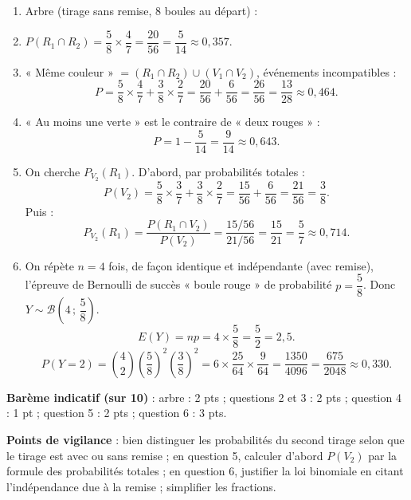\documentclass[11pt]{article}
\newcommand{\legende}[1]{\par\vspace{6pt}{\popsemi\fontsize{9}{11.5}\selectfont\color{popmuted}#1}}
\begin{document}
\begin{corrige}
\begin{enumerate}
\item Arbre (tirage sans remise, 8 boules au départ) :
\begin{popfigure}
\legende{Tirage successif sans remise de 2 boules}
\end{popfigure}
\item $P(R_1\cap R_2)=\dfrac58\times\dfrac47=\dfrac{20}{56}=\dfrac{5}{14}\approx0,357$.
\item « Même couleur » $=(R_1\cap R_2)\cup(V_1\cap V_2)$, événements incompatibles :
\[P=\dfrac58\times\dfrac47+\dfrac38\times\dfrac27=\dfrac{20}{56}+\dfrac{6}{56}=\dfrac{26}{56}=\dfrac{13}{28}\approx0,464.\]
\item « Au moins une verte » est le contraire de « deux rouges » :
\[P=1-\dfrac{5}{14}=\dfrac{9}{14}\approx0,643.\]
\item On cherche $P_{V_2}(R_1)$. D'abord, par probabilités totales :
\[P(V_2)=\dfrac58\times\dfrac37+\dfrac38\times\dfrac27=\dfrac{15}{56}+\dfrac{6}{56}=\dfrac{21}{56}=\dfrac38.\]
Puis :
\[P_{V_2}(R_1)=\dfrac{P(R_1\cap V_2)}{P(V_2)}=\dfrac{15/56}{21/56}=\dfrac{15}{21}=\dfrac57\approx0,714.\]
\item On répète $n=4$ fois, de façon identique et indépendante (avec remise), l'épreuve de Bernoulli de succès « boule rouge » de probabilité $p=\dfrac58$. Donc $Y\sim\mathcal{B}\left(4\,;\,\dfrac58\right)$.
\[E(Y)=np=4\times\dfrac58=\dfrac52=2,5.\]
\[P(Y=2)=\binom{4}{2}\left(\dfrac58\right)^2\left(\dfrac38\right)^2=6\times\dfrac{25}{64}\times\dfrac{9}{64}=\dfrac{1350}{4096}=\dfrac{675}{2048}\approx0,330.\]
\end{enumerate}
\textbf{Barème indicatif (sur 10)} : arbre : 2 pts ; questions 2 et 3 : 2 pts ; question 4 : 1 pt ; question 5 : 2 pts ; question 6 : 3 pts.

\textbf{Points de vigilance} : bien distinguer les probabilités du second tirage selon que le tirage est avec ou sans remise ; en question 5, calculer d'abord $P(V_2)$ par la formule des probabilités totales ; en question 6, justifier la loi binomiale en citant l'indépendance due à la remise ; simplifier les fractions.
\end{corrige}
\end{document}
